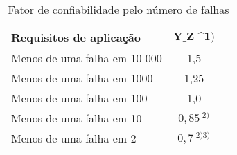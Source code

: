 \begin{table}[]
\centering
\caption{\label{tab:x} Fator de confiabilidade pelo número de falhas}
\begin{tabular}{ l c c}
\hline
\textbf{Requisitos de aplicação}        &$ \textbf{Y_Z \ ^{1)}}$ \\ \hline
Menos de uma falha em 10 000            & 1,5       \\
Menos de uma falha em 1000              & 1,25      \\
Menos de uma falha em 100               & 1,0       \\
Menos de uma falha em 10                & $0,85\ ^{2)}$   \\
Menos de uma falha em 2                 & $0,7\ ^{2) 3)}$
\end{tabular}
\end{table}